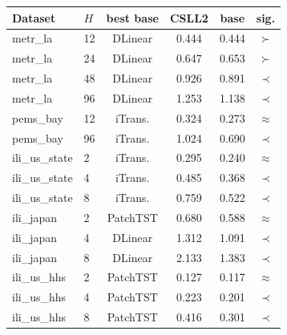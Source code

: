 \begin{tabular}{llcccc}
\toprule
Dataset & $H$ & best base & CSLL2 & base & sig. \\
\midrule
metr\_la & 12 & DLinear & 0.444 & 0.444 & $\succ$ \\
metr\_la & 24 & DLinear & 0.647 & 0.653 & $\succ$ \\
metr\_la & 48 & DLinear & 0.926 & 0.891 & $\prec$ \\
metr\_la & 96 & DLinear & 1.253 & 1.138 & $\prec$ \\
pems\_bay & 12 & iTrans. & 0.324 & 0.273 & $\approx$ \\
pems\_bay & 96 & iTrans. & 1.024 & 0.690 & $\prec$ \\
ili\_us\_state & 2 & iTrans. & 0.295 & 0.240 & $\approx$ \\
ili\_us\_state & 4 & iTrans. & 0.485 & 0.368 & $\prec$ \\
ili\_us\_state & 8 & iTrans. & 0.759 & 0.522 & $\prec$ \\
ili\_japan & 2 & PatchTST & 0.680 & 0.588 & $\approx$ \\
ili\_japan & 4 & DLinear & 1.312 & 1.091 & $\prec$ \\
ili\_japan & 8 & DLinear & 2.133 & 1.383 & $\prec$ \\
ili\_us\_hhs & 2 & PatchTST & 0.127 & 0.117 & $\approx$ \\
ili\_us\_hhs & 4 & PatchTST & 0.223 & 0.201 & $\prec$ \\
ili\_us\_hhs & 8 & PatchTST & 0.416 & 0.301 & $\prec$ \\
\bottomrule
\end{tabular}
